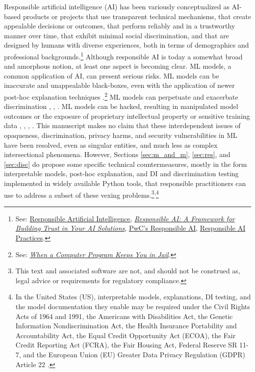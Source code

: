 \documentclass[information,article,submit,moreauthors,pdftex]{definitions/mdpi}
\begin{document}
Responsible artificial intelligence (AI) has been variously conceptualized as AI-based products or projects that use transparent technical mechanisms, that create appealable decisions or outcomes, that perform reliably and in a trustworthy manner over time, that exhibit minimal social discrimination, and that are designed by humans with diverse experiences, both in terms of demographics and professional backgrounds.\footnote{See: \href{https://ec.europa.eu/jrc/communities/sites/jrccties/files/03_dignum_v.pdf}{Responsible Artificial Intelligence}, \href{https://www.accenture.com/_acnmedia/pdf-92/accenture-afs-responsible-ai.pdf}{\textit{Responsible AI: A Framework for Building Trust in Your AI Solutions}}, \href{https://www.pwc.com/us/en/services/consulting/analytics/artificial-intelligence/what-is-responsible-ai.html}{PwC's Responsible AI}, \href{https://ai.google/responsibilities/responsible-ai-practices/}{Responsible AI Practices}.} Although responsible AI is today a somewhat broad and amorphous notion, at least one aspect is becoming clear. ML models, a common application of AI, can present serious risks. ML models can be inaccurate and unappealable black-boxes, even with the application of newer post-hoc explanation techniques \cite{please_stop}.\footnote{See: \href{https://www.nytimes.com/2017/06/13/opinion/how-computers-are-harming-criminal-justice.html}{\textit{When a Computer Program Keeps You in Jail}}.} ML models can perpetuate and exacerbate discrimination \cite{feldman2015certifying}, \cite{dwork2012fairness}, \cite{gender_shades}.  ML models can be hacked, resulting in manipulated model outcomes or the exposure of proprietary intellectual property or sensitive training data \cite{security_of_ml}, \cite{model_stealing}, \cite{membership_inference}, \cite{shokri2019privacy}. This manuscript makes no claim that these interdependent issues of opaqueness, discrimination, privacy harms, and security vulnerabilities in ML have been resolved, even as singular entities, and much less as complex intersectional phenomena. However, Sections \ref{sec:m_and_m}, \ref{sec:res}, and \ref{sec:disc} do propose some specific technical countermeasures, mostly in the form interpretable models, post-hoc explanation, and DI and discrimination testing implemented in widely available Python tools, that responsible practitioners can use to address a subset of these vexing problems.\footnote{This text and associated software are not, and should not be construed as, legal advice or requirements for regulatory compliance.}\textsuperscript{,}\footnote{In the United States (US), interpretable models, explanations, DI testing, and the model documentation they enable may be required under the Civil Rights Acts of 1964 and 1991, the Americans with Disabilities Act, the Genetic Information Nondiscrimination Act, the Health Insurance Portability and Accountability Act, the Equal Credit Opportunity Act (ECOA), the Fair Credit Reporting Act (FCRA), the Fair Housing Act, Federal Reserve SR 11-7, and the European Union (EU) Greater Data Privacy Regulation (GDPR) Article 22 \cite{ff_interpretability}.} 
\end{document}

